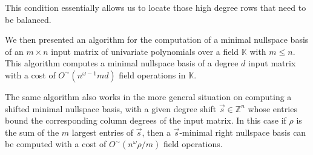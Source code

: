 \begin{comment}
Every problem with any unbalanced shift can be in fact reduced to
a problem with a shift that satisfying this condition if the degrees
of a resulting order basis is known. 
\end{comment}
{} %
\begin{comment}
Many unbalanced shift problems can be in fact converted to problems
satisfying this condition. 
\end{comment}
{} This condition essentially allows us to locate those high degree
rows that need to be balanced. %
\begin{comment}
In more general unbalanced shift cases, this algorithm may not work
well directly since we do not know in advance which are the high degree
rows need to be balanced. But it may work efficiently if we have an
effective way of estimating the resulting row degrees. 
\end{comment}
{} %
\begin{comment}
This extends the earlier work by the authors from ISSAC'09.
\end{comment}


We then presented an algorithm for the computation of a minimal nullspace
basis of an $m\times n$ input matrix of univariate polynomials over
a field $\mathbb{K}$ with $m\le n$. This algorithm computes a minimal
nullspace basis of a degree $d$ input matrix with a cost of $O^{\sim}\left(n^{\omega-1}md\right)$
field operations in $\mathbb{K}$. %
\begin{comment}
Here the soft-$O$ notation is Big-$O$ with log factors removed while
$\omega$ is the exponent of matrix multiplication.
\end{comment}
{} The same algorithm also works in the more general situation on computing
a shifted minimal nullspace basis, with a given degree shift $\vec{s}\in\mathbb{Z}^{n}$
whose entries bound the corresponding column degrees of the input
matrix. In this case if $\rho$ is the sum of the $m$ largest entries
of $\vec{s}$, then a $\vec{s}$-minimal right nullspace basis can
be computed with a cost of $O^{\sim}(n^{\omega}\rho/m)$ field operations. 

